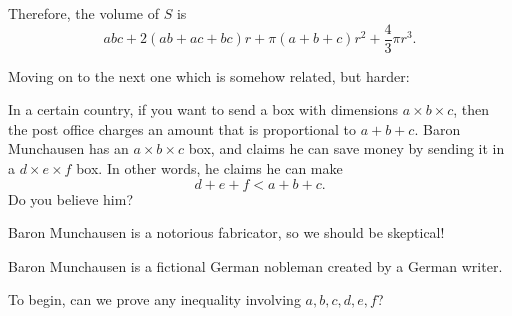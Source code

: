 
Therefore, the volume of $S$ is
$$abc + 2(ab + ac + bc) r + \pi (a + b + c) r^2 + \frac{4}{3} \pi r^3.$$

Moving on to the next one which is somehow related, but harder:

\begin{example}
In a certain country, if you want to send a box with dimensions $a \times b \times c$, then the post office charges an amount that is proportional to $a + b + c$.
Baron Munchausen has an $a \times b \times c$ box, and claims he can save money by sending it in a $d \times e \times f$ box. In other words, he claims he can make
$$d + e + f < a + b + c.$$
Do you believe him?    
\end{example}




Baron Munchausen is a notorious fabricator, so we should be skeptical!



Baron Munchausen is a fictional German nobleman created by a German writer.

To begin, can we prove any inequality involving $a,b,c,d,e,f$?





